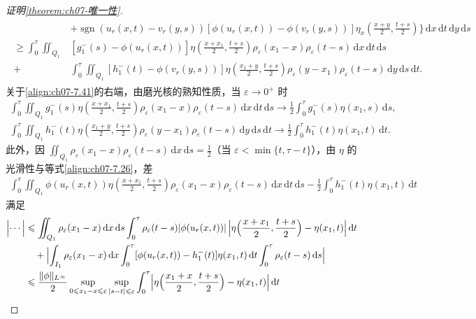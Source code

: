 \documentclass[../../main.tex]{subfiles}%
\begin{document}
\begin{proof}[证明\cref{theorem:ch07-唯一性}]
\begin{align}
\begin{aligned}
&+\operatorname{sgn}(u_r(x,t)-v_r(y,s))[\phi(u_r(x,t))-\phi(v_r(y,s))]\eta_x\left(\frac{x+y}{2},\frac{t+s}{2}\right)\Big\}\,\mathrm{d}x\,\mathrm{d}t\,\mathrm{d}y\,\mathrm{d}s\\
\geqslant\int_0^\tau\iint_{Q_1}&[g_1^-(s)-\phi(u_r(x,t))]\eta\left(\frac{x+x_1}{2},\frac{t+s}{2}\right)\rho_\varepsilon(x_1-x)\rho_\varepsilon(t-s)\,\mathrm{d}x\,\mathrm{d}t\,\mathrm{d}s\\
+&\int_0^\tau\iint_{Q_1}[h_1^-(t)-\phi(v_r(y,s))]\eta\left(\frac{x_1+y}{2},\frac{t+s}{2}\right)\rho_\varepsilon(y-x_1)\rho_\varepsilon(t-s)\,\mathrm{d}y\,\mathrm{d}s\,\mathrm{d}t.
\end{aligned} 
\label{align:ch07-7.41}
\end{align}
关于\eqref{align:ch07-7.41}的右端，由磨光核的熟知性质，当 $\varepsilon\to0^+$ 时
\begin{align*}
\int_0^\tau\iint_{Q_1}g_1^-(s)\eta\left(\frac{x+x_1}{2},\frac{t+s}{2}\right)\rho_\varepsilon(x_1-x)\rho_\varepsilon(t-s)\,\mathrm{d}x\,\mathrm{d}t\,\mathrm{d}s
\to\frac12\int_0^\tau g_1^-(s)\eta(x_1,s)\,\mathrm{d}s,
\end{align*}
\begin{align*}
\int_0^\tau\iint_{Q_1}h_1^-(t)\eta\left(\frac{x_1+y}{2},\frac{t+s}{2}\right)\rho_\varepsilon(y-x_1)\rho_\varepsilon(t-s)\,\mathrm{d}y\,\mathrm{d}s\,\mathrm{d}t
\to\frac12\int_0^\tau h_1^-(t)\eta(x_1,t)\,\mathrm{d}t.
\end{align*}
此外，因 $\iint_{Q_1}\rho_\varepsilon(x_1-x)\rho_\varepsilon(t-s)\,\mathrm{d}x\,\mathrm{d}s=\frac12$（当 $\varepsilon<\min\{t,\tau-t\}$），由 $\eta$ 的光滑性与等式\eqref{align:ch07-7.26}，差
\begin{align*}
\int_0^\tau\iint_{Q_1}\phi(u_r(x,t))\eta\left(\frac{x+x_1}{2},\frac{t+s}{2}\right)\rho_\varepsilon(x_1-x)\rho_\varepsilon(t-s)\,\mathrm{d}x\,\mathrm{d}t\,\mathrm{d}s
-\frac12\int_0^\tau h_1^-(t)\eta(x_1,t)\,\mathrm{d}t
\end{align*}
满足
\begin{align*}
\begin{aligned}
\Bigl|\cdots\Bigr|
&\leqslant\iint_{Q_1}\rho_\varepsilon(x_1-x)\,\mathrm{d}x\,\mathrm{d}s\int_0^\tau\rho_\varepsilon(t-s)|\phi(u_r(x,t))|\,\Bigl|\eta\Bigl(\frac{x+x_1}{2},\frac{t+s}{2}\Bigr)-\eta(x_1,t)\Bigr|\,\mathrm{d}t\\
&\quad+\Bigl|\int_{I_1}\rho_\varepsilon(x_1-x)\,\mathrm{d}x\int_0^\tau[\phi(u_r(x,t))-h_1^-(t)]\eta(x_1,t)\,\mathrm{d}t\int_0^\tau\rho_\varepsilon(t-s)\,\mathrm{d}s\Bigr|\\
&\leqslant\frac{\|\phi\|_{L^\infty}}{2}\sup_{0\leqslant x_1-x\leqslant\varepsilon}\sup_{|s-t|\leqslant\varepsilon}\int_0^\tau\Bigl|\eta\Bigl(\frac{x_1+x}{2},\frac{t+s}{2}\Bigr)-\eta(x_1,t)\Bigr|\,\mathrm{d}t\\

\end{aligned}
\end{align*}
\end{proof}
\end{document}
